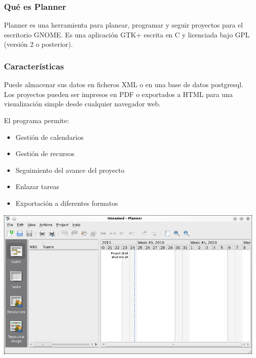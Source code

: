 \subsubsection{Qué es Planner}
Planner es una herramienta para planear, programar y seguir proyectos para el
escritorio GNOME. Es una aplicación GTK+ escrita en C y licenciada bajo GPL
(versión 2 o posterior).

\subsubsection{Características}
Puede almacenar sus datos en ficheros XML o en una base de datos
postgresql. Los proyectos pueden ser impresos en PDF o exportados a HTML para
una visualización simple desde cualquier navegador web.

El programa permite:
\begin{itemize}
    \item Gestión de calendarios
    \item Gestión de recursos
    \item Seguimiento del avance del proyecto
    \item Enlazar tareas
    \item Exportación a diferentes formatos
\end{itemize}

\begin{center}
\includegraphics[scale=0.6]{../3-workshop/2-tutoriales/img/planner_1}
\end{center}

